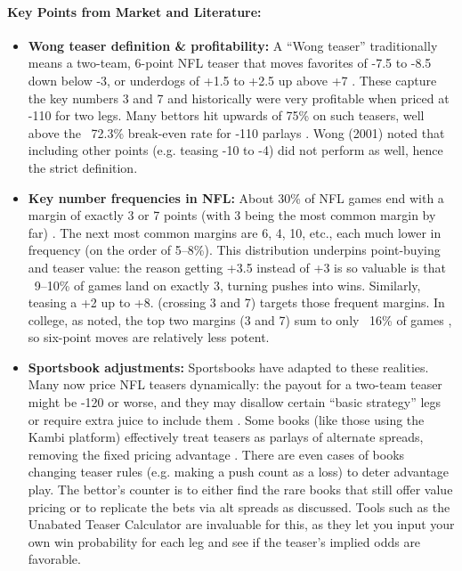 \documentclass[12pt]{article}
\begin{document}
\paragraph{Key Points from Market and Literature:}
\begin{itemize}
    \item \textbf{Wong teaser definition \& profitability:} A “Wong teaser” traditionally means a two-team, 6-point NFL teaser that moves favorites of -7.5 to -8.5 down below -3, or underdogs of +1.5 to +2.5 up above +7 \cite{Wong2001}. These capture the key numbers 3 and 7 and historically were very profitable when priced at -110 for two legs. Many bettors hit upwards of 75\% on such teasers, well above the ~72.3\% break-even rate for -110 parlays \cite{Andrews2024}. Wong (2001) noted that including other points (e.g. teasing -10 to -4) did not perform as well, hence the strict definition.
    \item \textbf{Key number frequencies in NFL:} About 30\% of NFL games end with a margin of exactly 3 or 7 points (with 3 being the most common margin by far) \cite{Walsh2024}. The next most common margins are 6, 4, 10, etc., each much lower in frequency (on the order of 5--8\%). This distribution underpins point-buying and teaser value: the reason getting +3.5 instead of +3 is so valuable is that ~9--10\% of games land on exactly 3, turning pushes into wins. Similarly, teasing a +2 up to +8. (crossing 3 and 7) targets those frequent margins. In college, as noted, the top two margins (3 and 7) sum to only ~16\% of games \cite{Moxley2023}, so six-point moves are relatively less potent.
    \item \textbf{Sportsbook adjustments:} Sportsbooks have adapted to these realities. Many now price NFL teasers dynamically: the payout for a two-team teaser might be -120 or worse, and they may disallow certain “basic strategy” legs or require extra juice to include them \cite{Andrews2024}. Some books (like those using the Kambi platform) effectively treat teasers as parlays of alternate spreads, removing the fixed pricing advantage \cite{Andrews2024}. There are even cases of books changing teaser rules (e.g. making a push count as a loss) to deter advantage play. The bettor’s counter is to either find the rare books that still offer value pricing or to replicate the bets via alt spreads as discussed. Tools such as the Unabated Teaser Calculator are invaluable for this, as they let you input your own win probability for each leg and see if the teaser’s implied odds are favorable.
\end{itemize}
\end{document}
